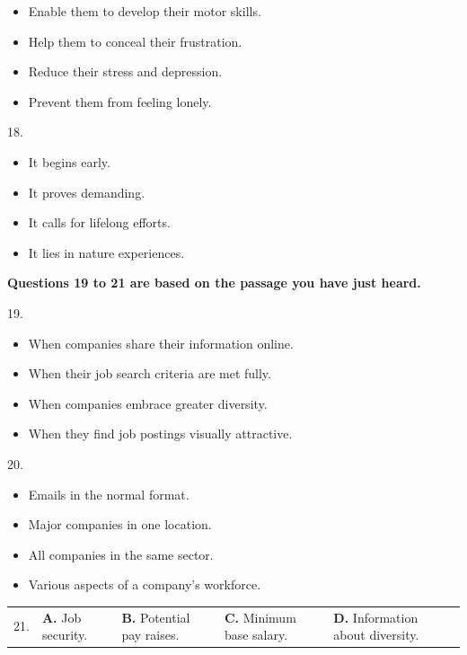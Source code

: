 \documentclass[UTF8,11pt]{ctexart}
\begin{document}
\begin{itemize}[leftmargin=2em,itemsep=.2em,topsep=.4em]\item[A.] Enable them to develop their motor skills.
\item[B.] Help them to conceal their frustration.
\item[C.] Reduce their stress and depression.
\item[D.] Prevent them from feeling lonely.
\end{itemize}

18.


\begin{itemize}[leftmargin=2em,itemsep=.2em,topsep=.4em]\item[A.] It begins early.
\item[B.] It proves demanding.
\item[C.] It calls for lifelong efforts.
\item[D.] It lies in nature experiences.
\end{itemize}

\textbf{Questions 19 to 21 are based on the passage you have just heard.}


19.


\begin{itemize}[leftmargin=2em,itemsep=.2em,topsep=.4em]\item[A.] When companies share their information online.
\item[B.] When their job search criteria are met fully.
\item[C.] When companies embrace greater diversity.
\item[D.] When they find job postings visually attractive.
\end{itemize}

20.


\begin{itemize}[leftmargin=2em,itemsep=.2em,topsep=.4em]\item[A.] Emails in the normal format.
\item[B.] Major companies in one location.
\item[C.] All companies in the same sector.
\item[D.] Various aspects of a company’s workforce.
\end{itemize}

\noindent\begin{tabularx}{\linewidth}{@{}lXXXX@{}}21. & \textbf{A.} Job security. & \textbf{B.} Potential pay raises. & \textbf{C.} Minimum base salary. & \textbf{D.} Information about diversity.\\\end{tabularx}\par
\end{document}
